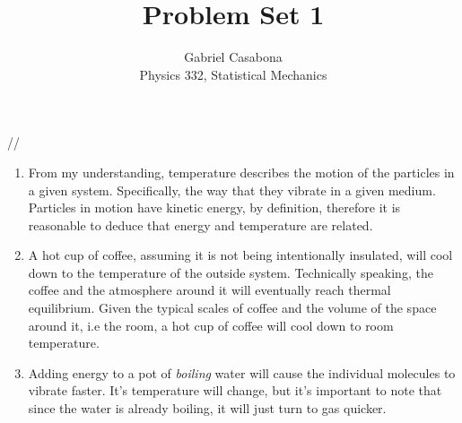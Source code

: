 \documentclass{article}
\newenvironment{problem}[2][Problem]{\begin{trivlist}
\item[\hskip \labelsep {\bfseries #1}\hskip \labelsep {\bfseries #2.}]}{\end{trivlist}}
\begin{document}

\title{Problem Set 1} %
\author{Gabriel Casabona\\Physics 332, Statistical Mechanics} %

\maketitle

%

\begin{problem}{(Nature of temperature)} // 
	\begin{enumerate}[label=\alph*)]
		\item From my understanding, temperature describes the motion of the particles in a given system. Specifically, the way that they vibrate in a given medium. Particles in motion have kinetic energy, by definition, therefore it is reasonable to deduce that energy and temperature are related.
		\item A hot cup of coffee, assuming it is not being intentionally insulated, will cool down to the temperature of the outside system. Technically speaking, the coffee and the atmosphere around it will eventually reach thermal equilibrium. Given the typical scales of coffee and the volume of the space around it, i.e the room, a hot cup of coffee will cool down to room temperature.
		\item Adding energy to a pot of \textit{boiling} water will cause the individual molecules to vibrate faster. It's temperature will change, but it's important to note that since the water is already boiling, it will just turn to gas quicker.
	\end{enumerate}
\end{problem}
\end{document}
